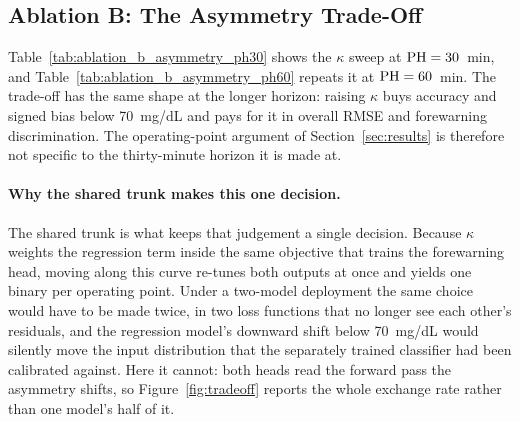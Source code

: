 \subsection{Ablation B: The Asymmetry Trade-Off}
\label{sec:appendix_ablation_b}




Table~\ref{tab:ablation_b_asymmetry_ph30} shows the $\kappa$ sweep at $\mathrm{PH} = 30$~min, 
and Table~\ref{tab:ablation_b_asymmetry_ph60} repeats it at $\mathrm{PH} = 60$~min. The trade-off has the
same shape at the longer horizon: raising $\kappa$ buys accuracy and signed bias
below 70~mg/dL and pays for it in overall RMSE and forewarning discrimination.
The operating-point argument of Section~\ref{sec:results} is therefore
not specific to the thirty-minute horizon it is made at.

\paragraph{Why the shared trunk makes this one decision.}
The shared trunk is what keeps that judgement a single decision. Because $\kappa$
weights the regression term inside the same objective that trains the forewarning
head, moving along this curve re-tunes both outputs at once and yields one binary
per operating point. Under a two-model deployment the same choice would have to
be made twice, in two loss functions that no longer see each other's
residuals, and the regression model's downward shift below 70~mg/dL would
silently move the input distribution that the separately trained classifier had
been calibrated against. Here it cannot: both heads read the forward pass the
asymmetry shifts, so Figure~\ref{fig:tradeoff} reports the whole exchange rate
rather than one model's half of it.

